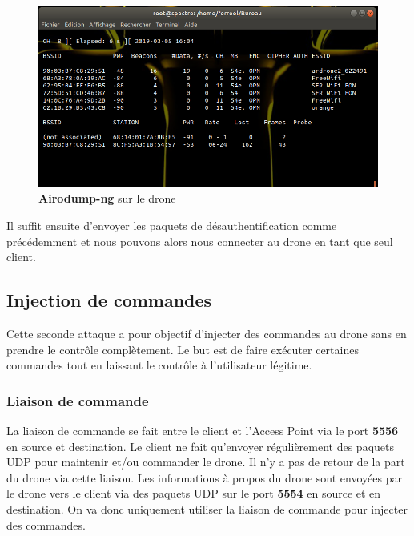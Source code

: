 \begin{figure}[H]
  \centering
  \includegraphics[scale=0.5]{images/airodump}
  \caption{\textbf{Airodump-ng} sur le drone}
\end{figure}

Il suffit ensuite d'envoyer les paquets de désauthentification comme précédemment et nous pouvons alors nous connecter au drone en tant que seul client.

\subsection{Injection de commandes}
Cette seconde attaque a pour objectif d'injecter des commandes au drone sans en prendre le contrôle complètement. Le but est de faire exécuter certaines commandes tout en laissant le contrôle à l'utilisateur légitime.

\subsubsection{Liaison de commande}
La liaison de commande se fait entre le client et l'Access Point via le port \textbf{5556} en source et destination. Le client ne fait qu'envoyer régulièrement des paquets UDP pour maintenir et/ou commander le drone. Il n'y a pas de retour de la part du drone via cette liaison. Les informations à propos du drone sont envoyées par le drone vers le client via des paquets UDP sur le port \textbf{5554} en source et en destination. On va donc uniquement utiliser la liaison de commande pour injecter des commandes.


